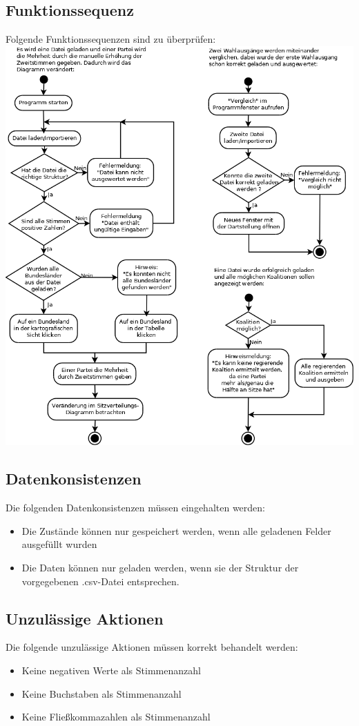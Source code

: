 \documentclass[10pt,a4paper]{article}
\begin{document}
\subsection{Funktionssequenz}
Folgende Funktionssequenzen sind zu überprüfen: \\
\includegraphics[scale=0.4]{Diagramm3}
\newpage
\subsection{Datenkonsistenzen}
Die folgenden Datenkonsistenzen müssen eingehalten werden:
\begin{itemize}
	\item Die Zustände können nur gespeichert werden, wenn alle geladenen Felder ausgefüllt wurden
	\item Die Daten können nur geladen werden, wenn sie der Struktur der vorgegebenen .csv-Datei entsprechen.
\end{itemize}
\subsection{Unzulässige Aktionen}
Die folgende unzulässige Aktionen müssen korrekt behandelt werden:
\begin{itemize}
	\item Keine negativen Werte als Stimmenanzahl
	\item Keine Buchstaben als Stimmenanzahl
	\item Keine Fließkommazahlen als Stimmenanzahl
\end{itemize}
\end{document}

